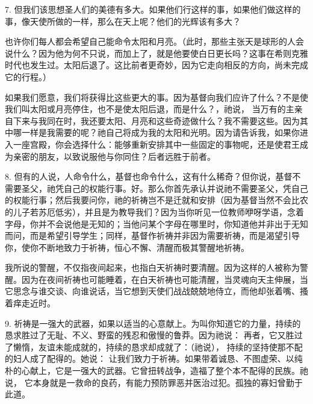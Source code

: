 7. 但我们该思想圣人们的美德有多大。如果他们行这样的事，如果他们做这样的事，像天使所做的一样，那么在天上呢？他们的光辉该有多大？\par

也许你们每人都会希望自己能命令太阳和月亮。（此时，那些主张天是球形的人会说什么？因为他为何不只说，而加上了，就是他要使白日更长吗？这事在希则克雅时代也发生过。太阳后退了。这比前者更奇妙，因为它走向相反的方向，尚未完成它的行程。）\par

如果我们愿意，我们将获得比这些更大的事。因为基督向我们应许了什么？不是使我们叫太阳或月亮停住，也不是使太阳后退，而是什么？，祂说， 当万有的主亲自下来与我同在时，我还要太阳、月亮和这些奇迹做什么？我不需要这些。因为其中哪一样是我需要的呢？祂自己将成为我的太阳和光明。因为请告诉我，如果你进入一座宫殿，你会选择什么：能够重新安排其中一些固定的事物呢，还是使君王成为亲密的朋友，以致说服他与你同住？后者远胜于前者。\par

8. 但有的人说，人命令什么，基督也命令什么，这有什么稀奇？但你说，基督不需要圣父，祂凭自己的权能行事。好。那么你首先承认并说祂不需要圣父，凭自己的权能行事；然后我要问你，祂的祈祷岂不是迁就和安排（因为基督当然不会比农的儿子若苏厄低劣），并且是为教导我们？因为当你听见一位教师咿呀学语，念着字母，你并不会说他是无知的；当他问某个字母在哪里时，你知道他并非出于无知而问，而是希望引导学生；同样，基督作祈祷并非因为需要祈祷，而是渴望引导你，使你不断地致力于祈祷，恒心不懈、清醒而极其警醒地祈祷。\par

我所说的警醒，不仅指夜间起来，也指白天祈祷时要清醒。因为这样的人被称为警醒。因为在夜间祈祷也可能睡着，在白天祈祷也可能清醒，当灵魂向天主伸展，当它思念与谁交谈、向谁说话，当它想到天使们战战兢兢地侍立，而他却张着嘴、搔着痒走近时。\par

9. 祈祷是一强大的武器，如果以适当的心意献上。为叫你知道它的力量，持续的恳求胜过了无耻、不义、野蛮的残忍和傲慢的鲁莽。因为祂说： 再者，它又胜过了懒惰，友谊未能成就的，持续的恳求却成就了：（祂说）， 持续的坚持使那不配的妇人成了配得的。她说： 让我们致力于祈祷。如果带着诚恳、不图虚荣、以纯朴的心献上，它是一强大的武器。它曾扭转战争，造福了整个本不配得的民族。祂说， 它本身就是一救命的良药，有能力预防罪恶并医治过犯。孤独的寡妇曾勤于此道。\par

